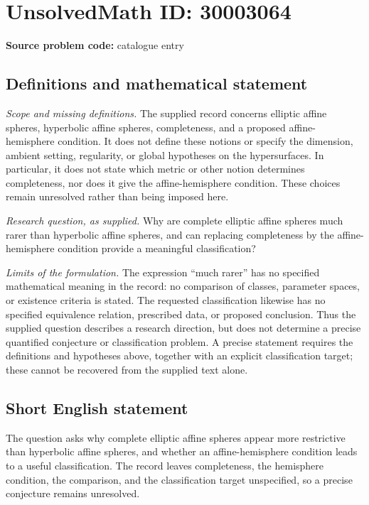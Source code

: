 \documentclass[11pt]{article}
\begin{document}
\section*{UnsolvedMath ID: 30003064}
\textbf{Source problem code:} catalogue entry
\subsection{Definitions and mathematical statement}
\emph{Scope and missing definitions.} The supplied record concerns elliptic affine spheres, hyperbolic affine spheres, completeness, and a proposed affine-hemisphere condition. It does not define these notions or specify the dimension, ambient setting, regularity, or global hypotheses on the hypersurfaces. In particular, it does not state which metric or other notion determines completeness, nor does it give the affine-hemisphere condition. These choices remain unresolved rather than being imposed here.

\emph{Research question, as supplied.} Why are complete elliptic affine spheres much rarer than hyperbolic affine spheres, and can replacing completeness by the affine-hemisphere condition provide a meaningful classification?

\emph{Limits of the formulation.} The expression ``much rarer'' has no specified mathematical meaning in the record: no comparison of classes, parameter spaces, or existence criteria is stated. The requested classification likewise has no specified equivalence relation, prescribed data, or proposed conclusion. Thus the supplied question describes a research direction, but does not determine a precise quantified conjecture or classification problem. A precise statement requires the definitions and hypotheses above, together with an explicit classification target; these cannot be recovered from the supplied text alone.
\subsection{Short English statement}
The question asks why complete elliptic affine spheres appear more restrictive than hyperbolic affine spheres, and whether an affine-hemisphere condition leads to a useful classification. The record leaves completeness, the hemisphere condition, the comparison, and the classification target unspecified, so a precise conjecture remains unresolved.
\end{document}
